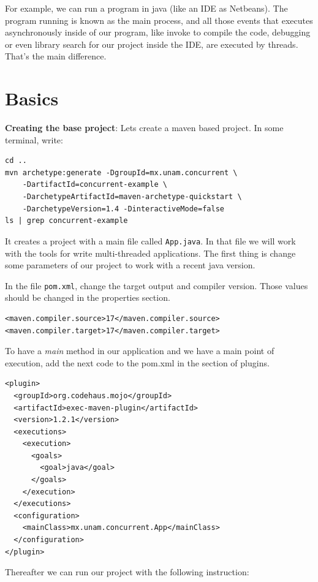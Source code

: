 \documentclass[openany, a4paper]{book}
\theoremstyle{break}
\theoremstyle{example}
\theoremstyle{note}
\theoremstyle{break}
\theoremstyle{exercise}
\begin{document}
For example, we can run a program in java (like an IDE as Netbeans). The
program running is known as the main process, and all those events that
executes asynchronously inside of our program, like invoke to compile the
code, debugging or even library search for our project inside the IDE, are
executed by threads. That's the main difference.


\section{Basics}
\label{sec:orgbbed3a6}

\textbf{Creating the base project}: Lets create a maven based project. In some
terminal, write:

\begin{verbatim}
cd ..
mvn archetype:generate -DgroupId=mx.unam.concurrent \
    -DartifactId=concurrent-example \
    -DarchetypeArtifactId=maven-archetype-quickstart \
    -DarchetypeVersion=1.4 -DinteractiveMode=false
ls | grep concurrent-example
\end{verbatim}

It creates a project with a main file called \texttt{App.java}. In that file we
will work with the tools for write multi-threaded applications. The first
thing is change some parameters of our project to work with a recent
java version.

In the file \texttt{pom.xml}, change the target output and compiler version. Those
values should be changed in the properties section.

\begin{verbatim}
<maven.compiler.source>17</maven.compiler.source>
<maven.compiler.target>17</maven.compiler.target>
\end{verbatim}

To have a \emph{main} method in our application and we have a main point of
execution, add the next code to the pom.xml in the section of plugins.

\begin{verbatim}
<plugin>
  <groupId>org.codehaus.mojo</groupId>
  <artifactId>exec-maven-plugin</artifactId>
  <version>1.2.1</version>
  <executions>
    <execution>
      <goals>
        <goal>java</goal>
      </goals>
    </execution>
  </executions>
  <configuration>
    <mainClass>mx.unam.concurrent.App</mainClass>
  </configuration>
</plugin>
\end{verbatim}

Thereafter we can run our project with the following instruction:
\end{document}
